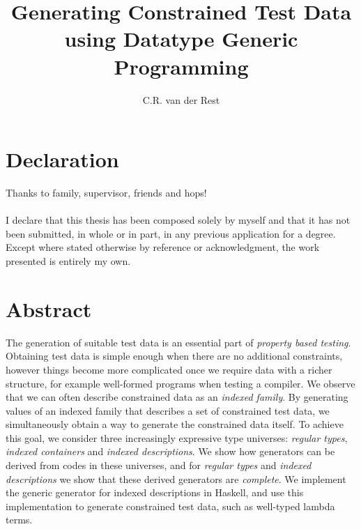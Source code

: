 \documentclass[a4paper,msc,twosized=semi]{uustthesis}
\title{Generating Constrained Test Data using Datatype Generic Programming}
\author{C.R. van der Rest}
\let\oldemph\emph
\renewcommand\emph[1]{{\large\oldemph{#1}}}
\begin{document}
\maketitle


\frontmatter
\tableofcontents

\chapter{Declaration}
Thanks to family, supervisor, friends and hops!
\\ \\
I declare that this thesis has been composed solely by myself and that it has not been
submitted, in whole or in part, in any previous application for a degree. Except where
stated otherwise by reference or acknowledgment, the work presented is entirely my
own.

\chapter{Abstract}
The generation of suitable test data is an essential part of \emph{property based testing}. Obtaining test data is simple enough when there are no additional constraints, however things become more complicated once we require data with a richer structure, for example well-formed programs when testing a compiler. We observe that we can often describe constrained data as an \emph{indexed family}. By generating values of an indexed family that describes a set of constrained test data, we simultaneously obtain a way to generate the constrained data itself. To achieve this goal, we consider three increasingly expressive type universes: \emph{regular types}, \emph{indexed containers} and \emph{indexed descriptions}. We show how generators can be derived from codes in these universes, and for \emph{regular types} and \emph{indexed descriptions} we show that these derived generators are \emph{complete}. We implement the generic generator for indexed descriptions in Haskell, and use this implementation to generate constrained test data, such as well-typed lambda terms. 

\mainmatter
\end{document}
